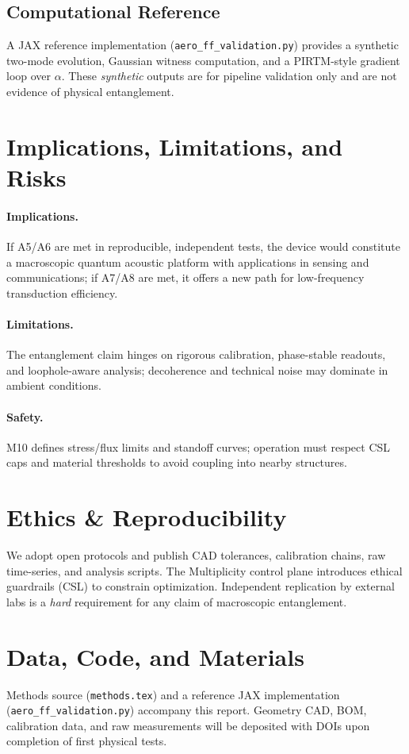 \documentclass[11pt]{article}
\begin{document}
\subsection{Computational Reference}
A JAX reference implementation (\texttt{aero\_ff\_validation.py}) provides a synthetic two-mode evolution, Gaussian witness computation, and a PIRTM-style gradient loop over \(\alpha\). These \emph{synthetic} outputs are for pipeline validation only and are not evidence of physical entanglement.

\section{Implications, Limitations, and Risks}
\paragraph{Implications.} If A5/A6 are met in reproducible, independent tests, the device would constitute a macroscopic quantum acoustic platform with applications in sensing and communications; if A7/A8 are met, it offers a new path for low-frequency transduction efficiency.

\paragraph{Limitations.} The entanglement claim hinges on rigorous calibration, phase-stable readouts, and loophole-aware analysis; decoherence and technical noise may dominate in ambient conditions.

\paragraph{Safety.} M10 defines stress/flux limits and standoff curves; operation must respect CSL caps and material thresholds to avoid coupling into nearby structures.

\section{Ethics \& Reproducibility}
We adopt open protocols and publish CAD tolerances, calibration chains, raw time-series, and analysis scripts. The Multiplicity control plane introduces ethical guardrails (CSL) to constrain optimization. Independent replication by external labs is a \emph{hard} requirement for any claim of macroscopic entanglement.

\section{Data, Code, and Materials}
Methods source (\texttt{methods.tex}) and a reference JAX implementation (\texttt{aero\_ff\_validation.py}) accompany this report. Geometry CAD, BOM, calibration data, and raw measurements will be deposited with DOIs upon completion of first physical tests.
\end{document}
